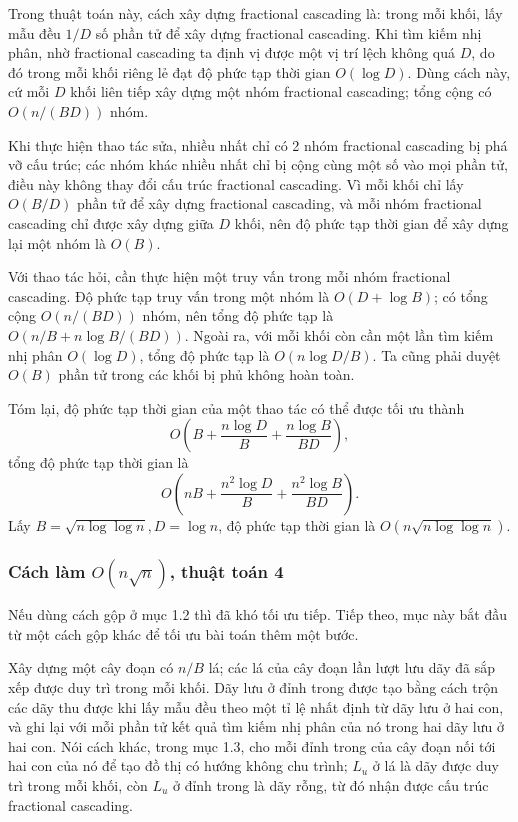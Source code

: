 \documentclass[11pt]{article}
\begin{document}
Trong thuật toán này, cách xây dựng fractional cascading là: trong mỗi khối, lấy
mẫu đều $1/D$ số phần tử để xây dựng fractional cascading. Khi tìm kiếm nhị
phân, nhờ fractional cascading ta định vị được một vị trí lệch không quá $D$,
do đó trong mỗi khối riêng lẻ đạt độ phức tạp thời gian $O(\log D)$. Dùng cách
này, cứ mỗi $D$ khối liên tiếp xây dựng một nhóm fractional cascading; tổng
cộng có $O(n/(BD))$ nhóm.

Khi thực hiện thao tác sửa, nhiều nhất chỉ có 2 nhóm fractional cascading bị
phá vỡ cấu trúc; các nhóm khác nhiều nhất chỉ bị cộng cùng một số vào mọi phần
tử, điều này không thay đổi cấu trúc fractional cascading. Vì mỗi khối chỉ lấy
$O(B/D)$ phần tử để xây dựng fractional cascading, và mỗi nhóm fractional
cascading chỉ được xây dựng giữa $D$ khối, nên độ phức tạp thời gian để xây
dựng lại một nhóm là $O(B)$.

Với thao tác hỏi, cần thực hiện một truy vấn trong mỗi nhóm fractional
cascading. Độ phức tạp truy vấn trong một nhóm là $O(D+\log B)$; có tổng cộng
$O(n/(BD))$ nhóm, nên tổng độ phức tạp là $O(n/B+n\log B/(BD))$. Ngoài ra, với
mỗi khối còn cần một lần tìm kiếm nhị phân $O(\log D)$, tổng độ phức tạp là
$O(n\log D/B)$. Ta cũng phải duyệt $O(B)$ phần tử trong các khối bị phủ không
hoàn toàn.

Tóm lại, độ phức tạp thời gian của một thao tác có thể được tối ưu thành
\[
O\left(B+\frac{n\log D}{B}+\frac{n\log B}{BD}\right),
\]
tổng độ phức tạp thời gian là
\[
O\left(nB+\frac{n^2\log D}{B}+\frac{n^2\log B}{BD}\right).
\]
Lấy $B=\sqrt{n\log\log n},D=\log n$, độ phức tạp thời gian là
$O(n\sqrt{n\log\log n})$.

\subsubsection{Cách làm \texorpdfstring{$O(n\sqrt n)$}{O(n sqrt(n))}, thuật toán 4}

Nếu dùng cách gộp ở mục 1.2 thì đã khó tối ưu tiếp. Tiếp theo, mục này bắt đầu
từ một cách gộp khác để tối ưu bài toán thêm một bước.

Xây dựng một cây đoạn có $n/B$ lá; các lá của cây đoạn lần lượt lưu dãy đã sắp
xếp được duy trì trong mỗi khối. Dãy lưu ở đỉnh trong được tạo bằng cách trộn
các dãy thu được khi lấy mẫu đều theo một tỉ lệ nhất định từ dãy lưu ở hai con,
và ghi lại với mỗi phần tử kết quả tìm kiếm nhị phân của nó trong hai dãy lưu ở
hai con. Nói cách khác, trong mục 1.3, cho mỗi đỉnh trong của cây đoạn nối tới
hai con của nó để tạo đồ thị có hướng không chu trình; $L_u$ ở lá là dãy được
duy trì trong mỗi khối, còn $L_u$ ở đỉnh trong là dãy rỗng, từ đó nhận được cấu
trúc fractional cascading.
\end{document}
